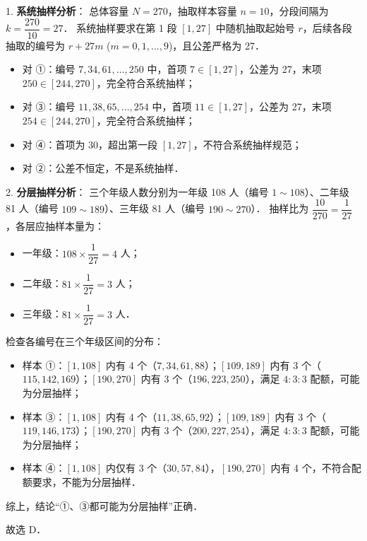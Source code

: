 \begin{answer}
1. \textbf{系统抽样分析}：
   总体容量 $N = 270$，抽取样本容量 $n = 10$，分段间隔为 $k = \dfrac{270}{10} = 27$．
   系统抽样要求在第 1 段 $[1, 27]$ 中随机抽取起始号 $r$，后续各段抽取的编号为 $r + 27m$ ($m = 0, 1, \dots, 9$)，且公差严格为 27．
\begin{itemize}
\item 对 ①：编号 $7, 34, 61, \dots, 250$ 中，首项 $7 \in [1, 27]$，公差为 27，末项 $250 \in [244, 270]$，完全符合系统抽样；
\item 对 ③：编号 $11, 38, 65, \dots, 254$ 中，首项 $11 \in [1, 27]$，公差为 27，末项 $254 \in [244, 270]$，完全符合系统抽样；
\item 对 ④：首项为 30，超出第一段 $[1, 27]$，不符合系统抽样规范；
\item 对 ②：公差不恒定，不是系统抽样．
\end{itemize}
2. \textbf{分层抽样分析}：
   三个年级人数分别为一年级 108 人（编号 $1 \sim 108$）、二年级 81 人（编号 $109 \sim 189$）、三年级 81 人（编号 $190 \sim 270$）．
   抽样比为 $\dfrac{10}{270} = \dfrac{1}{27}$，各层应抽样本量为：
\begin{itemize}
\item 一年级：$108 \times \dfrac{1}{27} = 4$ 人；
\item 二年级：$81 \times \dfrac{1}{27} = 3$ 人；
\item 三年级：$81 \times \dfrac{1}{27} = 3$ 人．
\end{itemize}
   检查各编号在三个年级区间的分布：
\begin{itemize}
\item 样本 ①：$[1, 108]$ 内有 4 个（$7, 34, 61, 88$）；$[109, 189]$ 内有 3 个（$115, 142, 169$）；$[190, 270]$ 内有 3 个（$196, 223, 250$），满足 $4 : 3 : 3$ 配额，可能为分层抽样；
\item 样本 ③：$[1, 108]$ 内有 4 个（$11, 38, 65, 92$）；$[109, 189]$ 内有 3 个（$119, 146, 173$）；$[190, 270]$ 内有 3 个（$200, 227, 254$），满足 $4 : 3 : 3$ 配额，可能为分层抽样；
\item 样本 ④：$[1, 108]$ 内仅有 3 个（$30, 57, 84$），$[190, 270]$ 内有 4 个，不符合配额要求，不能为分层抽样．
\end{itemize}

综上，结论“①、③都可能为分层抽样”正确．

故选 D．


\end{answer}
